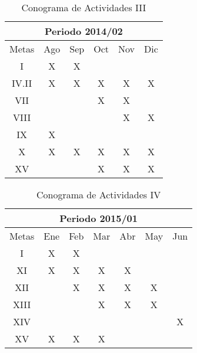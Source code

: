 \begin{table}[h]
\centering
%

\begin{tabular}{|c|c|c|c|c|c|}
\hline
\multicolumn{6}{|c|}{Periodo 2014/02}\tabularnewline
\hline
\hline
Metas & Ago & Sep & Oct & Nov & Dic\tabularnewline
\hline
I & X & X &  &  & \tabularnewline
\hline
IV.II & X & X & X & X & X\tabularnewline
\hline
VII &  &  & X & X & \tabularnewline
\hline
VIII &  &  &  & X & X \tabularnewline
\hline
IX & X &  &  &  & \tabularnewline
\hline
X & X & X & X & X & X\tabularnewline
\hline
XV &  &  & X & X & X\tabularnewline
\hline
\end{tabular}
%

\caption{Conograma de Actividades III}
\label{reglasIII}
\end{table}%




\begin{table}[h]
\centering
%

\begin{tabular}{|c|c|c|c|c|c|c|}
\hline
\multicolumn{7}{|c|}{Periodo 2015/01}\tabularnewline
\hline
\hline
Metas & Ene & Feb & Mar & Abr & May & Jun\tabularnewline
\hline
I & X & X &  &  &  & \tabularnewline
\hline
XI & X & X & X & X &  & \tabularnewline
\hline
XII &  & X & X & X & X & \tabularnewline
\hline
XIII &  &  & X & X & X & \tabularnewline
\hline
XIV &  &  &  &  &  & X\tabularnewline
\hline
XV & X & X & X &  &  & \tabularnewline
\hline
\end{tabular}
%

\caption{Conograma de Actividades IV}
\label{reglasIV}
\end{table}%




